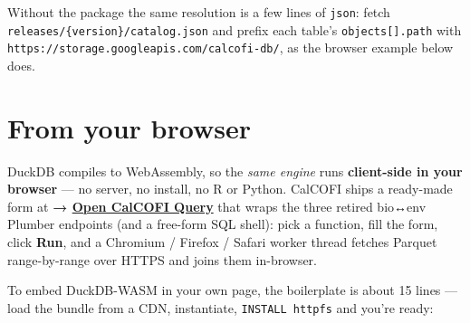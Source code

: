 \documentclass[
  letterpaper,
  DIV=11,
  numbers=noendperiod]{scrreprt}
\begin{document}
Without the package the same resolution is a few lines of \texttt{json}:
fetch \texttt{releases/\{version\}/catalog.json} and prefix each table's
\texttt{objects{[}{]}.path} with
\texttt{https://storage.googleapis.com/calcofi-db/}, as the browser
example below does.

\section{From your browser}\label{from-your-browser}

DuckDB compiles to WebAssembly, so the \emph{same engine} runs
\textbf{client-side in your browser} --- no server, no install, no R or
Python. CalCOFI ships a ready-made form at \textbf{→
\href{https://calcofi.io/db-query/}{Open CalCOFI Query}} that wraps the
three retired bio↔env Plumber endpoints (and a free-form SQL shell):
pick a function, fill the form, click \textbf{Run}, and a Chromium /
Firefox / Safari worker thread fetches Parquet range-by-range over HTTPS
and joins them in-browser.

To embed DuckDB-WASM in your own page, the boilerplate is about 15 lines
--- load the bundle from a CDN, instantiate, \texttt{INSTALL\ httpfs}
and you're ready:
\end{document}
